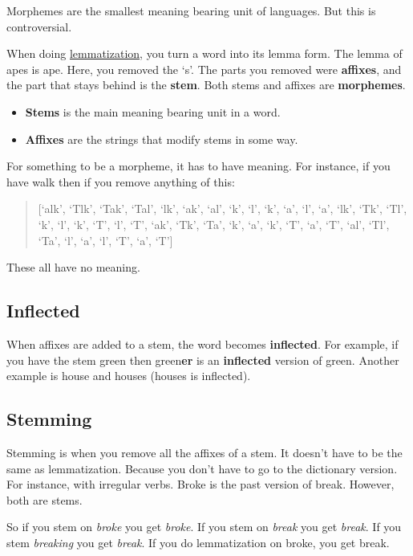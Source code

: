 \documentclass[
  11pt,
  british,
]{article}
\providecommand{\tightlist}{%
  \setlength{\itemsep}{0pt}\setlength{\parskip}{0pt}}
\begin{document}
Morphemes are the smallest meaning bearing unit of languages. But this
is controversial.

When doing \href{Lemma.md}{lemmatization}, you turn a word into its
lemma form. The lemma of apes is ape. Here, you removed the `s'. The
parts you removed were \textbf{affixes}, and the part that stays behind
is the \textbf{stem}. Both stems and affixes are \textbf{morphemes}.

\begin{itemize}
\tightlist
\item
  \textbf{Stems} is the main meaning bearing unit in a word.
\item
  \textbf{Affixes} are the strings that modify stems in some way.
\end{itemize}

For something to be a morpheme, it has to have meaning. For instance, if
you have walk then if you remove anything of this:

\begin{quote}
{[}`alk', `Tlk', `Tak', `Tal', `lk', `ak', `al', `k', `l', `k', `a',
`l', `a', `lk', `Tk', `Tl', `k', `l', `k', `T', `l', `T', `ak', `Tk',
`Ta', `k', `a', `k', `T', `a', `T', `al', `Tl', `Ta', `l', `a', `l',
`T', `a', `T'{]}
\end{quote}

These all have no meaning.

\hypertarget{inflected}{%
\subsection{Inflected}\label{inflected}}

When affixes are added to a stem, the word becomes \textbf{inflected}.
For example, if you have the stem green then green\textbf{er} is an
\textbf{inflected} version of green. Another example is house and houses
(houses is inflected).

\hypertarget{stemming}{%
\subsection{Stemming}\label{stemming}}

Stemming is when you remove all the affixes of a stem. It doesn't have
to be the same as lemmatization. Because you don't have to go to the
dictionary version. For instance, with irregular verbs. Broke is the
past version of break. However, both are stems.

So if you stem on \emph{broke} you get \emph{broke}. If you stem on
\emph{break} you get \emph{break}. If you stem \emph{breaking} you get
\emph{break}. If you do lemmatization on broke, you get break.
\end{document}
